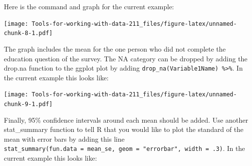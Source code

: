 \documentclass[
]{book}
\newenvironment{Shaded}{\begin{snugshade}}{\end{snugshade}}
\newcommand{\DataTypeTok}[1]{\textcolor[rgb]{0.13,0.29,0.53}{#1}}
\newcommand{\FloatTok}[1]{\textcolor[rgb]{0.00,0.00,0.81}{#1}}
\newcommand{\KeywordTok}[1]{\textcolor[rgb]{0.13,0.29,0.53}{\textbf{#1}}}
\newcommand{\NormalTok}[1]{#1}
\newcommand{\OperatorTok}[1]{\textcolor[rgb]{0.81,0.36,0.00}{\textbf{#1}}}
\newcommand{\StringTok}[1]{\textcolor[rgb]{0.31,0.60,0.02}{#1}}
\begin{document}
Here is the command and graph for the current example:

\begin{Shaded}
\end{Shaded}

\texttt{[image: Tools-for-working-with-data-211\_files/figure-latex/unnamed-chunk-8-1.pdf]}

The graph includes the mean for the one person who did not complete the education question of the survey. The NA category can be dropped by adding the drop.na function to the ggplot plot by adding \texttt{drop\_na(Variable1Name)\ \%\textgreater{}\%}. In the current example this looks like:

\begin{Shaded}
\end{Shaded}

\texttt{[image: Tools-for-working-with-data-211\_files/figure-latex/unnamed-chunk-9-1.pdf]}

Finally, 95\% confidence intervals around each mean should be added. Use another stat\_summary function to tell R that you would like to plot the standard of the mean with error bars by adding this line \texttt{stat\_summary(fun.data\ =\ mean\_se,\ geom\ =\ "errorbar",\ width\ =\ .3)}. In the current example this looks like:

\begin{Shaded}
\end{Shaded}
\end{document}
